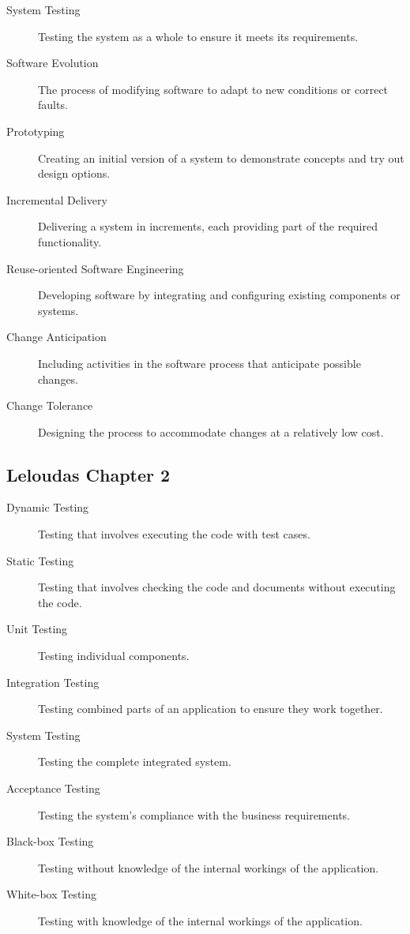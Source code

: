 \documentclass{article}
\begin{document}
\begin{description}
  \item[System Testing] Testing the system as a whole to ensure it meets its requirements.
  
  \item[Software Evolution] The process of modifying software to adapt to new conditions or correct faults.
  
  \item[Prototyping] Creating an initial version of a system to demonstrate concepts and try out design options.
  
  \item[Incremental Delivery] Delivering a system in increments, each providing part of the required functionality.
  
  \item[Reuse-oriented Software Engineering] Developing software by integrating and configuring existing components or systems.
  
  \item[Change Anticipation] Including activities in the software process that anticipate possible changes.
  
  \item[Change Tolerance] Designing the process to accommodate changes at a relatively low cost.
\end{description}

\subsection{Leloudas Chapter 2}

\begin{description}
  \item[Dynamic Testing] Testing that involves executing the code with test cases.
  \item[Static Testing] Testing that involves checking the code and documents without executing the code.
  \item[Unit Testing] Testing individual components.
  \item[Integration Testing] Testing combined parts of an application to ensure they work together.
  \item[System Testing] Testing the complete integrated system.
  \item[Acceptance Testing] Testing the system’s compliance with the business requirements.
  \item[Black-box Testing] Testing without knowledge of the internal workings of the application.
  \item[White-box Testing] Testing with knowledge of the internal workings of the application.
\end{description}
\end{document}
